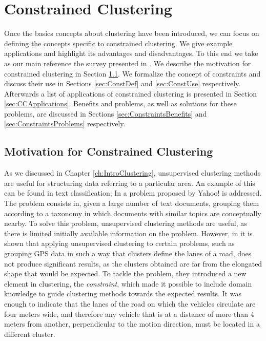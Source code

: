 \chapter{Constrained Clustering}\label{ch:ConstrainedClustering}

Once the basics concepts about clustering have been introduced, we can focus on defining the concepts specific to constrained clustering. We give example applications and highlight its advantages and disadvantages. To this end we take as our main reference the survey presented in \cite{davidson2007survey}. We describe the motivation for constrained clustering in Section \ref{sec:CCMotiv}. We formalize the concept of constraints and discuss their use in Sections \ref{sec:ConstDef} and \ref{sec:ConstUse} respectively. Afterwards a list of applications of constrained clustering is presented in Section \ref{sec:CCApplications}. Benefits and problems, as well as solutions for these problems, are discussed in Sections \ref{sec:ConstraintsBenefits} and \ref{sec:ConstraintsProblems} respectively.

\section{Motivation for Constrained Clustering} \label{sec:CCMotiv}

As we discussed in Chapter \ref{ch:IntroClustering}, unsupervised clustering methods are useful for structuring data referring to a particular area. An example of this can be found in text classification; In \cite{cohn2003semi} a problem proposed by Yahoo! is addressed. The problem consists in, given a large number of text documents, grouping them according to a taxonomy in which documents with similar topics are conceptually nearby. To solve this problem, unsupervised clustering methods are useful, as there is limited initially available information on the problem. However, in \cite{wagstaff2001constrained} it is shown that applying unsupervised clustering to certain problems, such as grouping \acf{GPS} data in such a way that clusters define the lanes of a road, does not produce significant results, as the clusters obtained are far from the elongated shape that would be expected. To tackle the problem, they introduced a new element in clustering, the \textit{constraint}, which made it possible to include domain knowledge to guide clustering methods towards the expected results. It was enough to indicate that the lanes of the road on which the vehicles circulate are four meters wide, and therefore any vehicle that is at a distance of more than 4 meters from another, perpendicular to the motion direction, must be located in a different cluster.

